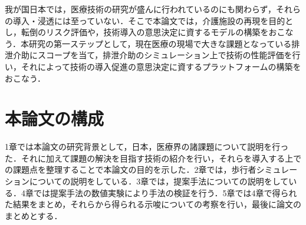 我が国日本では，医療技術の研究が盛んに行われているのにも関わらず，それらの導入・浸透には至っていない．そこで本論文では，介護施設の再現を目的とし，転倒のリスク評価や，技術導入の意思決定に資するモデルの構築をおこなう．本研究の第一ステップとして，現在医療の現場で大きな課題となっている排泄介助にスコープを当て，排泄介助のシミュレーション上で技術の性能評価を行い，それによって技術の導入促進の意思決定に資するプラットフォームの構築をおこなう．

\section{本論文の構成}

1章では本論文の研究背景として，日本，医療界の諸課題について説明を行った．それに加えて課題の解決を目指す技術の紹介を行い，それらを導入する上での課題点を整理することで本論文の目的を示した．2章では，歩行者シミュレーションについての説明をしている．3章では，提案手法についての説明をしている．4章では提案手法の数値実験により手法の検証を行う．5章では4章で得られた結果をまとめ，それらから得られる示唆についての考察を行い，最後に論文のまとめとする．
